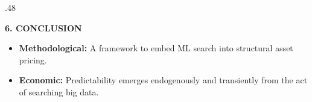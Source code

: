\documentclass[final]{beamer}
\begin{document}
\begin{frame}[t, plain]
\begin{columns}[t]
\begin{column}{.48\textwidth}
\begin{center}
                \vspace{1cm}

                \begin{tcolorbox}[basebox, colback=gray800, colframe=gray900]
                    {\color{white}\Large\textbf{6. CONCLUSION}} \vspace{0.5cm}
                    \begin{itemize}
                        \item \color{gray200} \textbf{Methodological:} A framework to embed ML search into structural asset pricing.
                        \item \color{gray200} \textbf{Economic:} Predictability emerges endogenously and transiently from the act of searching big data.
                    \end{itemize}
                \end{tcolorbox}

            \end{center}
        \end{column}

    \end{columns}
\end{frame}
\end{document}
